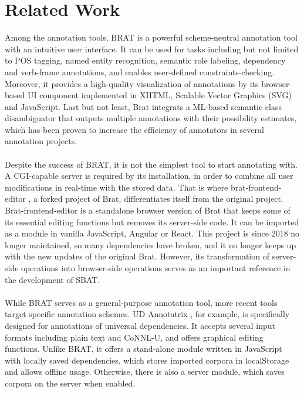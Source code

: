 \documentclass[12ptm a4paper]{article}
\begin{document}
\section{Related Work}
Among the annotation tools, BRAT \citep{stenetorp-etal-2012-brat} is a powerful scheme-neutral annotation tool with an intuitive user interface. It can be used for tasks including but not limited to POS tagging, named entity recognition, semantic role labeling, dependency and verb-frame annotations, and enables user-defined constraints-checking. Moreover, it provides a high-quality visualization of annotations by its browser-based UI component implemented in XHTML, Scalable Vector Graphics (SVG) and JavaScript. Last but not least, Brat integrats a ML-based semantic class disambiguator that outputs multiple annotations with their possibility estimates, which has been proven to increase the efficiency of annotators in several annotation projects.\\
\\
Despite the success of BRAT, it is not the simplest tool to start annotating with. A CGI-capable server is required by its installation, in order to combine all user modifications in real-time with the stored data. That is where brat-frontend-editor \citep{brat-frontend-editor}, a forked project of Brat, differentiates itself from the original project. Brat-frontend-editor is a standalone browser version of Brat that keeps some of its essential editing functions but removes its server-side code. It can be imported as a module in vanilla JavaScript, Angular or React. This project is since 2018 no longer maintained, so many dependencies have broken, and it no longer keeps up with the new updates of the original Brat. However, its transformation of server-side operations into browser-side operations serves as an important reference in the development of SBAT.\\
\\
While BRAT serves as a general-purpose annotation tool, more recent tools target specific annotation schemes. UD Annotatrix \citep{tyers-etal-2017-ud}, for example, is specifically designed for annotations of universal dependencies. It accepts several input formats including plain text and CoNNL-U, and offers graphical editing functions. Unlike BRAT, it offers a stand-alone module written in JavaScript with locally saved dependencies, which stores imported corpora in localStorage and allows offline usage. Otherwise, there is also a server module, which saves corpora on the server when enabled.\\
\end{document}
